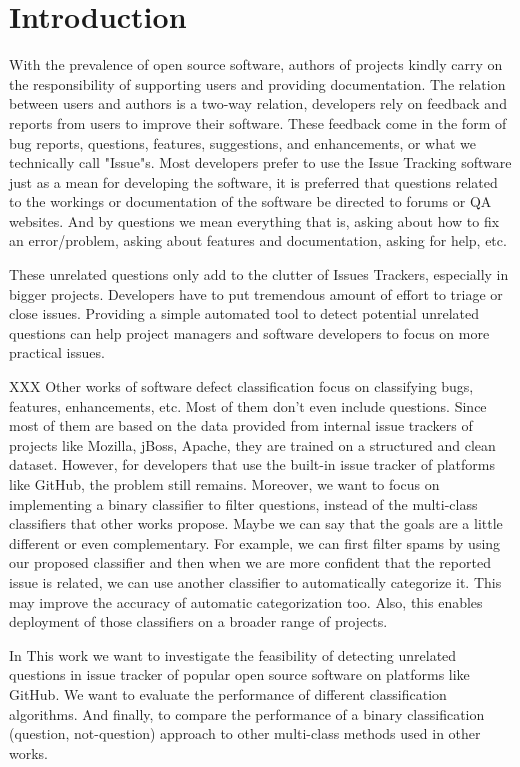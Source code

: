 \documentclass[conference]{IEEEtran}
\begin{document}
\section{Introduction}
With the prevalence of open source software, authors of projects kindly carry on 
the responsibility of supporting users and providing documentation. The relation 
between users and authors is a two-way relation, developers rely on feedback and reports from 
users to improve their software. These feedback come in the form of bug reports, questions, 
features, suggestions, and enhancements, or what we technically call "Issue"s. Most developers
prefer to use the Issue Tracking software just as a mean for developing the software, it is preferred 
that questions related to the workings or documentation of the software be directed to forums or QA
websites. And by questions we mean everything that is, asking about how to fix an error/problem, 
asking about features and documentation, asking for help, etc.

These unrelated questions only add to the clutter of Issues Trackers, especially in bigger projects.
Developers have to put tremendous amount of effort to triage or close issues. Providing a 
simple automated tool to detect potential unrelated questions can help project managers 
and software developers to focus on more practical issues.

XXX Other works of software defect classification focus on classifying bugs, 
features, enhancements, etc. Most of them don't even include questions. Since most of them are 
based on the data provided from internal issue trackers of projects like Mozilla, jBoss, Apache, they are
trained on a structured and clean dataset. However, for developers that use the built-in issue tracker
of platforms like GitHub, the problem still remains. Moreover, we want to focus on implementing 
a binary classifier to filter questions, instead of the multi-class classifiers that other 
works propose. Maybe we can say that the goals are a little different or even complementary. 
For example, we can first filter spams by using our proposed classifier and then when 
we are more confident that the reported issue is related, we can use another classifier to 
automatically categorize it. This may improve the accuracy of automatic categorization too. Also, this 
enables deployment of those classifiers on a broader range of projects.

In This work we want to investigate the feasibility of detecting unrelated questions
in issue tracker of popular open source software on platforms like GitHub. We want to evaluate the performance
of different classification algorithms. And finally, to compare the performance of a binary classification 
(question, not-question) approach to other multi-class methods used in other works.
\end{document}
